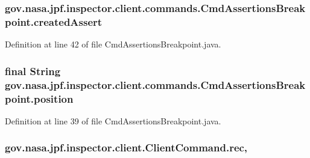\subsubsection[{\texorpdfstring{created\+Assert}{createdAssert}}]{ gov.\+nasa.\+jpf.\+inspector.\+client.\+commands.\+Cmd\+Assertions\+Breakpoint.\+created\+Assert\hspace{0.3cm}{\ttfamily [private]}}\hypertarget{classgov_1_1nasa_1_1jpf_1_1inspector_1_1client_1_1commands_1_1_cmd_assertions_breakpoint_ad1982dcd049bd771eccd31379176ba04}{}\label{classgov_1_1nasa_1_1jpf_1_1inspector_1_1client_1_1commands_1_1_cmd_assertions_breakpoint_ad1982dcd049bd771eccd31379176ba04}


Definition at line 42 of file Cmd\+Assertions\+Breakpoint.\+java.

\subsubsection[{\texorpdfstring{position}{position}}]{\setlength{\rightskip}{0pt plus 5cm}final String gov.\+nasa.\+jpf.\+inspector.\+client.\+commands.\+Cmd\+Assertions\+Breakpoint.\+position\hspace{0.3cm}{\ttfamily [private]}}\hypertarget{classgov_1_1nasa_1_1jpf_1_1inspector_1_1client_1_1commands_1_1_cmd_assertions_breakpoint_a058ca4f053ad9225b170a5004e970f6d}{}\label{classgov_1_1nasa_1_1jpf_1_1inspector_1_1client_1_1commands_1_1_cmd_assertions_breakpoint_a058ca4f053ad9225b170a5004e970f6d}


Definition at line 39 of file Cmd\+Assertions\+Breakpoint.\+java.

\subsubsection[{\texorpdfstring{rec}{rec}}]{ gov.\+nasa.\+jpf.\+inspector.\+client.\+Client\+Command.\+rec\hspace{0.3cm}{\ttfamily [protected]}, {\ttfamily [inherited]}}\hypertarget{classgov_1_1nasa_1_1jpf_1_1inspector_1_1client_1_1_client_command_af4246f2427035c72a6af45a2c61361f7}{}\label{classgov_1_1nasa_1_1jpf_1_1inspector_1_1client_1_1_client_command_af4246f2427035c72a6af45a2c61361f7}


